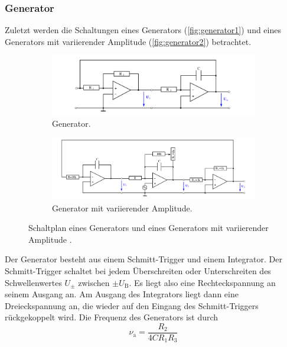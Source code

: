 \subsubsection{Generator}
Zuletzt werden die Schaltungen eines Generators (\autoref{fig:generator1}) und eines Generators mit variierender Amplitude (\autoref{fig:generator2}) betrachtet.
\begin{figure}
    \centering
    \begin{subfigure}{\textwidth}
        \includegraphics[width=\textwidth]{"content/pics/generator1.png"}
        \caption{Generator.}
        \label{fig:generator1}
    \end{subfigure}
    \vfill
    \begin{subfigure}{0.9\textwidth}
        \includegraphics[width=\textwidth]{"content/pics/generator2.png"}
        \caption{Generator mit variierender Amplitude.}
        \label{fig:generator2}
    \end{subfigure}
    \caption{Schaltplan eines Generators und eines Generators mit variierender Amplitude \cite{v51}.}
    \label{fig:generator}
\end{figure}
Der Generator besteht aus einem Schmitt-Trigger und einem Integrator. Der Schmitt-Trigger schaltet bei jedem Überschreiten oder Unterschreiten des Schwellenwertes $U_{\pm}$
zwischen $\pm U_\text{B}$. Es liegt also eine Rechteckspannung an seinem Ausgang an. Am Ausgang des Integrators liegt dann eine Dreieckspannung an, die wieder auf den Eingang des 
Schmitt-Triggers rückgekoppelt wird. 
Die Frequenz des Generators ist durch
\begin{equation}
\nu_\text{a} = \frac{R_2}{4C R_1 R_3}
\label{eq:freq_generator}
\end{equation}
